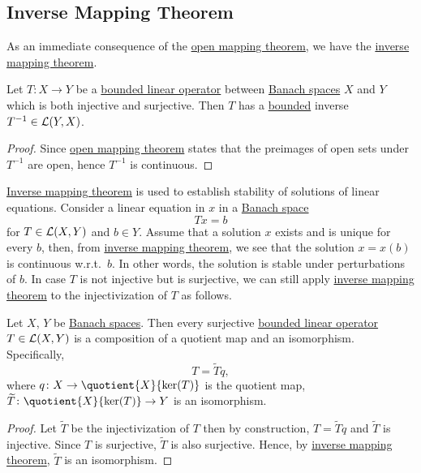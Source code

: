 \subsection{Inverse Mapping Theorem}
As an immediate consequence of the \hyperref[thm:open-mapping]{open mapping theorem}, we have the \hyperref[thm:inverse-mapping]{inverse mapping theorem}.

\begin{theorem}\label{thm:inverse-mapping}
	Let \(T\colon X\to Y\) be a \hyperref[def:bounded-linear-op]{bounded linear operator} between \hyperref[def:Banach-space]{Banach spaces} \(X\) and \(Y\) which is both injective and surjective. Then \(T\) has a \hyperref[rmk:bounded-op]{bounded} inverse \(T^{-1} \in \mathcal{\MakeUppercase{l}} (Y, X)\).
\end{theorem}
\begin{proof}
	Since \hyperref[thm:open-mapping]{open mapping theorem} states that the preimages of open sets under \(T^{-1} \) are open, hence \(T^{-1} \) is continuous.
\end{proof}

\hyperref[thm:inverse-mapping]{Inverse mapping theorem} is used to establish stability of solutions of linear equations. Consider a linear equation in \(x\) in a \hyperref[def:Banach-space]{Banach space}
\[
	Tx = b
\]
for \(T\in \mathcal{\MakeUppercase{l}} (X, Y)\) and \(b\in Y\). Assume that a solution \(x\) exists and is unique for every \(b\), then, from \hyperref[thm:inverse-mapping]{inverse mapping theorem}, we see that the solution \(x = x(b)\) is continuous w.r.t.\ \(b\). In other words, the solution is stable under perturbations of \(b\). In case \(T\) is not injective but is surjective, we can still apply \hyperref[thm:inverse-mapping]{inverse mapping theorem} to the injectivization of \(T\) as follows.

\begin{corollary}\label{col:surjective-op-are-essentially-quo-maps}
	Let \(X\), \(Y\) be \hyperref[def:Banach-space]{Banach spaces}. Then every surjective \hyperref[def:bounded-linear-op]{bounded linear operator} \(T\in \mathcal{\MakeUppercase{l}} (X, Y)\) is a composition of a quotient map and an isomorphism. Specifically,
	\[
		T = \widetilde{T} q,
	\]
	where \(q\colon X\to \quotient{X}{\ker(T)} \) is the quotient map, \(\widetilde{T} \colon \quotient{X}{\ker(T)} \to Y\) is an isomorphism.
\end{corollary}
\begin{proof}
	Let \(\widetilde{T} \) be the injectivization of \(T\) then by construction, \(T = \widetilde{T} q\) and \(\widetilde{T} \) is injective. Since \(T\) is surjective, \(\widetilde{T} \) is also surjective. Hence, by \hyperref[thm:inverse-mapping]{inverse mapping theorem}, \(\widetilde{T} \) is an isomorphism.
\end{proof}

